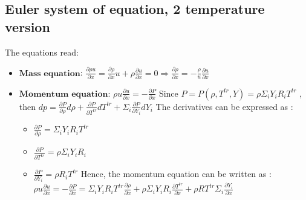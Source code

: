 \documentclass[letterpaper,10pt,english]{jupyterBook}
\begin{document}
\subsection{Euler system of equation, 2 temperature version}
\label{\detokenize{2_Temperature/_2T_Problem_class_definition:euler-system-of-equation-2-temperature-version}}
\sphinxAtStartPar
The equations read:
\begin{itemize}
\item {} 
\sphinxAtStartPar
\(\textbf{Mass equation}\): 
\( \frac{\partial \rho u}{\partial x} = \frac{\partial \rho}{\partial x}u + \rho \frac{\partial u}{\partial x} = 0 \Longrightarrow \frac{\partial \rho}{\partial x} = - \frac{\rho}{u} \frac{\partial u}{\partial x} \)

\item {} 
\sphinxAtStartPar
\(\textbf{Momentum equation}\): 
\( \rho u \frac{\partial u}{\partial x} = - \frac{\partial P}{\partial x} \) 
Since \( P = P(\rho, T^{tr}, Y) = \rho \Sigma_i Y_i R_i T^{tr} \) , then \( dp = \frac{\partial P}{\partial \rho} d \rho + \frac{\partial P}{\partial T^{tr}} d T^{tr} + \Sigma_i \frac{\partial P}{\partial Y_i} d Y_i \)  
The derivatives can be expressed as : 
\begin{itemize}
\item {} 
\sphinxAtStartPar
\( \frac{\partial P}{\partial \rho} = \Sigma_i Y_i R_i T^{tr} \) 

\item {} 
\sphinxAtStartPar
\( \frac{\partial P}{\partial T^{tr}} = \rho \Sigma_i Y_i R_i\) 

\item {} 
\sphinxAtStartPar
\( \frac{\partial P}{\partial Y_i} = \rho R_i T^{tr}\) 
Hence, the momentum equation can be written as : 
\( \rho u \frac{\partial u}{\partial x} = - \frac{\partial P}{\partial x} = \Sigma_i Y_i R_i T^{tr} \frac{\partial \rho}{\partial x} + \rho \Sigma_i Y_i R_i \frac{\partial T^{tr}}{\partial x} + \rho R T^{tr} \Sigma_i \frac{\partial Y_i}{\partial x}\)

\end{itemize}

\end{itemize}
\end{document}
